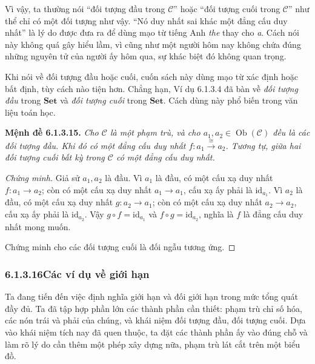 Vì vậy, ta thường nói ``đối tượng đầu trong $\mathcal C$'' hoặc ``đối tượng cuối trong $\mathcal C$'' như thể chỉ có một đối tượng như vậy. ``Nó duy nhất sai khác một đẳng cấu duy nhất'' là lý do được đưa ra để dùng mạo từ tiếng Anh \emph{the} thay cho \emph{a}. Cách nói này không quá gây hiểu lầm, vì cũng như một người hôm nay không chứa đúng những nguyên tử của người ấy hôm qua, sự khác biệt đó không quan trọng.

Khi nói về đối tượng đầu hoặc cuối, cuốn sách này dùng mạo từ xác định hoặc bất định, tùy cách nào tiện hơn. Chẳng hạn, Ví dụ 6.1.3.4 đã bàn về \emph{đối tượng đầu} trong $\mathbf{Set}$ và \emph{đối tượng cuối} trong $\mathbf{Set}$. Cách dùng này phổ biến trong văn liệu toán học.

\noindent\textbf{Mệnh đề 6.1.3.15.} \emph{Cho $\mathcal C$ là một phạm trù, và cho $a_1,a_2\in\operatorname{Ob}(\mathcal C)$ đều là các đối tượng đầu. Khi đó có một đẳng cấu duy nhất $f:a_1\xrightarrow{\cong}a_2$. Tương tự, giữa hai đối tượng cuối bất kỳ trong $\mathcal C$ có một đẳng cấu duy nhất.}
\begin{proof}[Chứng minh]
Giả sử $a_1,a_2$ là đầu. Vì $a_1$ là đầu, có một cấu xạ duy nhất $f:a_1\to a_2$; còn có một cấu xạ duy nhất $a_1\to a_1$, cấu xạ ấy phải là $\mathrm{id}_{a_1}$. Vì $a_2$ là đầu, có một cấu xạ duy nhất $g:a_2\to a_1$; còn có một cấu xạ duy nhất $a_2\to a_2$, cấu xạ ấy phải là $\mathrm{id}_{a_2}$. Vậy $g\circ f=\mathrm{id}_{a_1}$ và $f\circ g=\mathrm{id}_{a_2}$, nghĩa là $f$ là đẳng cấu duy nhất mong muốn.

Chứng minh cho các đối tượng cuối là đối ngẫu tương ứng.
\end{proof}

\subsubsection*{6.1.3.16\quad Các ví dụ về giới hạn}
Ta đang tiến đến việc định nghĩa giới hạn và đối giới hạn trong mức tổng quát đầy đủ. Ta đã tập hợp phần lớn các thành phần cần thiết: phạm trù chỉ số hóa, các nón trái và phải của chúng, và khái niệm đối tượng đầu, đối tượng cuối. Dựa vào khái niệm tích nay đã quen thuộc, ta đặt các thành phần ấy vào đúng chỗ và làm rõ lý do cần thêm một phép xây dựng nữa, phạm trù lát cắt trên một biểu đồ.
